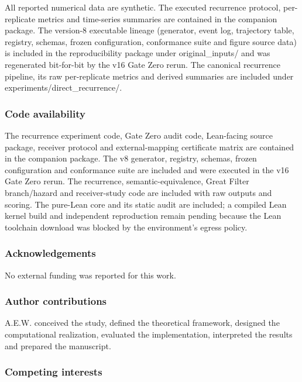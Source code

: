 All reported numerical data are synthetic. The executed recurrence
protocol, per-replicate metrics and time-series summaries are contained
in the companion package. The version-8 executable lineage (generator,
event log, trajectory table, registry, schemas, frozen configuration,
conformance suite and figure source data) is included in the
reproducibility package under original\_inputs/ and was regenerated
bit-for-bit by the v16 Gate Zero rerun. The canonical recurrence
pipeline, its raw per-replicate metrics and derived summaries are
included under experiments/direct\_recurrence/.

\hypertarget{code-availability}{%
\subsubsection{Code availability}\label{code-availability}}

The recurrence experiment code, Gate Zero audit code, Lean-facing source
package, receiver protocol and external-mapping certificate matrix are
contained in the companion package. The v8 generator, registry, schemas,
frozen configuration and conformance suite are included and were
executed in the v16 Gate Zero rerun. The recurrence,
semantic-equivalence, Great Filter branch/hazard and receiver-study code
are included with raw outputs and scoring. The pure-Lean core and its
static audit are included; a compiled Lean kernel build and independent
reproduction remain pending because the Lean toolchain download was
blocked by the environment's egress policy.

\hypertarget{acknowledgements}{%
\subsubsection{Acknowledgements}\label{acknowledgements}}

No external funding was reported for this work.

\hypertarget{author-contributions}{%
\subsubsection{Author contributions}\label{author-contributions}}

A.E.W. conceived the study, defined the theoretical framework, designed
the computational realization, evaluated the implementation, interpreted
the results and prepared the manuscript.

\hypertarget{competing-interests}{%
\subsubsection{Competing interests}\label{competing-interests}}

